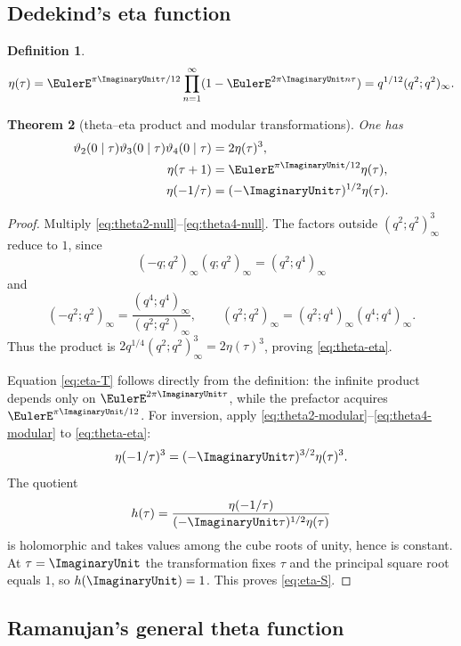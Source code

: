 \documentclass[11pt,oneside]{article}
\newtheorem{theorem}{Theorem}[section]
\theoremstyle{definition}
\newtheorem{definition}[theorem]{Definition}
\begin{document}
\subsection{Dedekind's eta function}

\begin{definition}
\begin{equation}\label{eq:eta-def}
 \eta(\tau)=\EulerE^{\pi\ImaginaryUnit\tau/12}
 \prod_{n=1}^\infty(1-\EulerE^{2\pi\ImaginaryUnit n\tau})
 =q^{1/12}(q^2;q^2)_\infty.
\end{equation}
\end{definition}

\begin{theorem}[theta--eta product and modular transformations]\label{thm:eta}
One has
\begin{align}
 \vartheta_2(0\mid\tau)\vartheta_3(0\mid\tau)
 \vartheta_4(0\mid\tau)&=2\eta(\tau)^3,\label{eq:theta-eta}\\
 \eta(\tau+1)&=\EulerE^{\pi\ImaginaryUnit/12}\eta(\tau),\label{eq:eta-T}\\
 \eta(-1/\tau)&=(-\ImaginaryUnit\tau)^{1/2}\eta(\tau).\label{eq:eta-S}
\end{align}
\end{theorem}

\begin{proof}
Multiply \eqref{eq:theta2-null}--\eqref{eq:theta4-null}. The factors
outside $(q^2;q^2)_\infty^3$ reduce to $1$, since
\[
 (-q;q^2)_\infty(q;q^2)_\infty=(q^2;q^4)_\infty
\]
and
\[
 (-q^2;q^2)_\infty=\frac{(q^4;q^4)_\infty}{(q^2;q^2)_\infty},
 \qquad
 (q^2;q^2)_\infty=(q^2;q^4)_\infty(q^4;q^4)_\infty.
\]
Thus the product is
$2q^{1/4}(q^2;q^2)_\infty^3=2\eta(\tau)^3$, proving
\eqref{eq:theta-eta}.

Equation \eqref{eq:eta-T} follows directly from the definition:
the infinite product depends only on $\EulerE^{2\pi\ImaginaryUnit\tau}$, while the
prefactor acquires $\EulerE^{\pi\ImaginaryUnit/12}$. For inversion, apply
\eqref{eq:theta2-modular}--\eqref{eq:theta4-modular} to
\eqref{eq:theta-eta}:
\[
 \eta(-1/\tau)^3=(-\ImaginaryUnit\tau)^{3/2}\eta(\tau)^3.
\]
The quotient
\[
 h(\tau)=\frac{\eta(-1/\tau)}
 {(-\ImaginaryUnit\tau)^{1/2}\eta(\tau)}
\]
is holomorphic and takes values among the cube roots of unity, hence is
constant. At $\tau=\ImaginaryUnit$ the transformation fixes $\tau$ and the
principal square root equals $1$, so $h(\ImaginaryUnit)=1$. This proves
\eqref{eq:eta-S}.
\end{proof}

\subsection{Ramanujan's general theta function}
\end{document}
